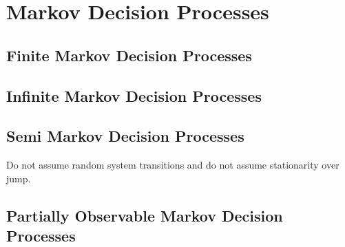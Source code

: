 %
%

\section{Markov Decision Processes}
\subsection{Finite Markov Decision Processes}
\subsection{Infinite Markov Decision Processes}
\subsection{Semi Markov Decision Processes}
Do not assume random system transitions and do not assume stationarity over jump.
\subsection{Partially Observable Markov Decision Processes}
